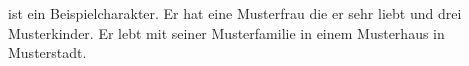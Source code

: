 
{%
  ist ein Beispielcharakter. Er hat eine Musterfrau die er sehr liebt und drei Musterkinder.
  Er lebt mit seiner Musterfamilie in einem Musterhaus in Musterstadt.
}
